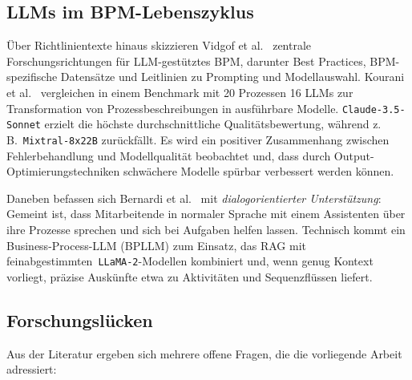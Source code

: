 \subsection*{\acp{LLM} im BPM-Lebenszyklus}

Über Richtlinientexte hinaus skizzieren Vidgof et al.\ \cite{vidgof2023largelanguagemodelsbusiness} zentrale Forschungsrichtungen für \ac{LLM}-gestütztes \ac{BPM}, darunter Best Practices, \ac{BPM}-spezifische Datensätze und Leitlinien zu Prompting und Modellauswahl. Kourani et al.\ \cite{kourani2025evaluating} vergleichen in einem Benchmark mit 20 Prozessen 16 \acp{LLM} zur Transformation von Prozessbeschreibungen in ausführbare Modelle. \texttt{Claude-3.5-Sonnet} erzielt die höchste durchschnittliche Qualitätsbewertung, während z.\,B.\ \texttt{Mixtral-8x22B} zurückfällt. Es wird ein positiver Zusammenhang zwischen Fehlerbehandlung und Modellqualität beobachtet und, dass durch Output-Optimierungstechniken schwächere Modelle spürbar verbessert werden können.

Daneben befassen sich Bernardi et al.\ \cite{bernardi2024conversing} mit \emph{dialogorientierter Unterstützung}: Gemeint ist, dass Mitarbeitende in normaler Sprache mit einem Assistenten über ihre Prozesse sprechen und sich bei Aufgaben helfen lassen. Technisch kommt ein Business-Process-LLM (BPLLM) zum Einsatz, das \ac{RAG} mit feinabgestimmten\linebreak~\texttt{LLaMA-2}-Modellen kombiniert und, wenn genug Kontext vorliegt, präzise Auskünfte etwa zu Aktivitäten und Sequenzflüssen liefert.

\subsection*{Forschungslücken}

Aus der Literatur ergeben sich mehrere offene Fragen, die die vorliegende Arbeit adressiert:

